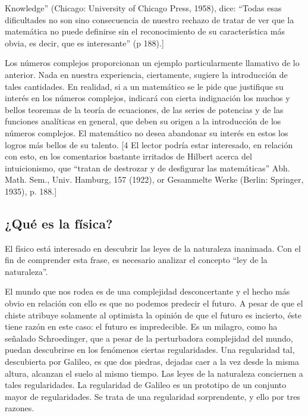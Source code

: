 \documentclass[a4paper, 12pt]{article}
\begin{document}
Knowledge'' (Chicago: University of Chicago Press, 1958), dice: ``Todas esas dificultades no son sino consecuencia de nuestro rechazo de tratar de ver que la matemática no puede definirse sin el reconocimiento de su característica más obvia, es decir, que es interesante''  (p 188).]



Los números complejos proporcionan un ejemplo particularmente llamativo de lo anterior. Nada en nuestra experiencia, ciertamente, sugiere la introducción de tales cantidades. En realidad, si a un matemático se le pide que justifique su interés en los números complejos, indicará con cierta indignación los muchos y bellos teoremas de la teoría de ecuaciones, de las series de potencias y de las funciones analíticas en general, que deben su origen a la introducción de los números complejos. El matemático no desea abandonar su interés en estos los logros más bellos de su talento.  [4 El lector podría estar interesado, en relación con esto, en los comentarios bastante irritados de Hilbert acerca del intuicionismo, que ``tratan de destrozar y de desfigurar las matemáticas'' Abh. Math. Sem., Univ. Hamburg, 157 (1922), or Gesammelte Werke (Berlin: Springer, 1935), p. 188.]

\subsection*{¿Qué es la física?}


El físico está interesado en descubrir las leyes de la naturaleza inanimada. Con el fin de comprender esta frase, es necesario analizar el concepto ``ley de la naturaleza''.

El mundo que nos rodea es de una complejidad desconcertante y el hecho más obvio en relación con ello es que no podemos predecir el futuro. A pesar de que el chiste atribuye solamente al optimista la opinión de que el futuro es incierto, éste tiene razón en este caso: el futuro es impredecible. Es un milagro, como ha señalado Schroedinger, que a pesar de la perturbadora complejidad del mundo, puedan descubrirse en los fenómenos ciertas regularidades. Una regularidad tal, descubierta por Galileo, es que dos piedras, dejadas caer a la vez desde la misma altura, alcanzan el suelo al mismo tiempo. Las leyes de la naturaleza conciernen a tales regularidades. La regularidad de Galileo es un prototipo de un conjunto mayor de regularidades. Se trata de una regularidad sorprendente, y ello por tres razones.
\end{document}
